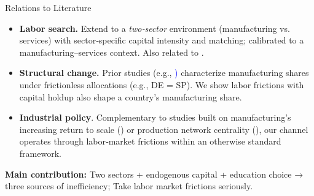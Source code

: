 \documentclass[9pt,xcolor={svgnames}]{beamer}
\begin{document}
\begin{frame}{Relations to Literature}

\begin{itemize}
    \item \textbf{Labor search.}   Extend \textcolor{blue}{\cite{acemoglu1999holdups}} to a \emph{two‐sector} environment (manufacturing vs. services) with sector‐specific capital intensity and matching; calibrated to a manufacturing–services context. Also related to \textcolor{blue}{\cite{cardullo2015sunk}}.

    \medskip

    \item \textbf{Structural change.} Prior studies (e.g., \textcolor{blue}{\cite{Rodrik2016, huneeus2024heterogeneous})}  characterize manufacturing shares under frictionless allocations (e.g., DE = SP).  We show labor frictions with capital holdup also shape a country's manufacturing share.

\medskip

    \item \textbf{Industrial policy}.  Complementary to studies built on manufacturing's increasing return to scale (\textcolor{blue}{\cite{matsuyama1991increasing}}) or production network centrality (\textcolor{blue}{\cite{liu2019industrial}}), our channel operates through labor‐market frictions within an otherwise standard framework.
\end{itemize}

\vspace{1em}
\textbf{Main contribution:} Two sectors + endogenous capital + education choice → three sources of inefficiency; Take labor market frictions seriously. 
\end{frame}
\end{document}
